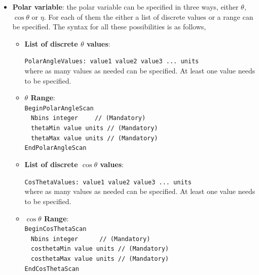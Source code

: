 \begin{itemize}
\begin{itemize}
   \item {\bf Polar variable}: the polar variable can be specified in three ways, either $\theta$, $\cos\theta$ or $\eta$. For each of them the either a list of discrete values or 
   a range can be specified. The syntax for all these possibilities is as follows,
   
   \begin{itemize}
     \item {\bf List of discrete $\theta$ values}:
     
     \noindent
     {\tt PolarAngleValues: value1  value2  value3 ... units } \\
     \noindent
     where as many values as needed can be specified. At least one value needs to be specified.
     ~\\
     
     \item {\bf $\theta$ Range}:
     ~\\
     \noindent     
     {\tt BeginPolarAngleScan} \\
     $~~~~${\tt Nbins       integer $~~~~~~$ // (Mandatory)} \\
     $~~~~${\tt thetaMin    value units      // (Mandatory)} \\
     $~~~~${\tt thetaMax    value units      // (Mandatory)} \\
     {\tt EndPolarAngleScan}
     ~\\
     
     \item {\bf List of discrete $\cos\theta$ values}:
     
     \noindent
     {\tt CosThetaValues: value1  value2  value3 ... units } \\
     \noindent
     where as many values as needed can be specified. At least one value needs to be specified.
     ~\\
     
     \item {\bf $\cos\theta$ Range}:
     ~\\
     \noindent     
     {\tt BeginCosThetaScan} \\
     $~~~~${\tt Nbins          integer $~~~~~~~~~$ // (Mandatory)} \\
     $~~~~${\tt costhetaMin    value units         // (Mandatory)} \\
     $~~~~${\tt costhetaMax    value units         // (Mandatory)} \\
     {\tt EndCosThetaScan}
     ~\\
     

\end{itemize}
\end{itemize}
\end{itemize}
